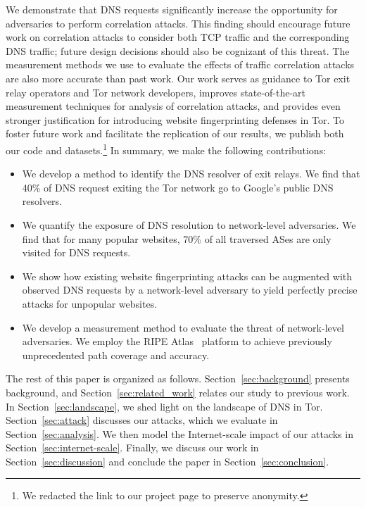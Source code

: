 We demonstrate that DNS requests significantly increase the opportunity
for adversaries to perform correlation attacks. This finding should
encourage future work on correlation attacks to consider both TCP
traffic and the corresponding DNS traffic; future design decisions
should also be cognizant of this threat.  The measurement methods we use
to evaluate the effects of traffic correlation attacks are also more
accurate than past work. Our work \first serves as guidance to Tor exit
relay operators and Tor network developers, \second improves
state-of-the-art measurement techniques for analysis of correlation attacks, and \third
provides even stronger justification for introducing website fingerprinting defenses in
Tor.  To foster future work and facilitate the replication of
our results, we publish both our code and datasets.\footnote{We redacted
  the link to our project page to preserve anonymity.} In
summary, we make the following contributions:
\begin{itemize}
\item We develop a method to identify the DNS resolver of exit
  relays. We find that 40\% of DNS request exiting the Tor network go to
  Google's public DNS resolvers.

	\item We quantify the exposure of DNS resolution to
		network-level adversaries.  We find that for many popular
		websites, 70\% of all traversed ASes are only visited for DNS requests.

	\item We show how existing website fingerprinting attacks can be augmented with
	observed DNS requests by a network-level adversary to yield perfectly precise
	\name attacks for unpopular websites.

	\item We develop a measurement method to evaluate the threat of
		network-level adversaries. We employ the RIPE Atlas~\cite{atlas}
		platform to achieve previously unprecedented path coverage and accuracy.
\end{itemize}
\noindent
The rest of this paper is organized as follows.
Section~\ref{sec:background} presents background, and
Section~\ref{sec:related_work} relates our study to previous work.  In
Section~\ref{sec:landscape}, we shed light on the landscape of DNS in
Tor.  Section~\ref{sec:attack} discusses our \name attacks, which we
evaluate in Section~\ref{sec:analysis}.  We then model the
Internet-scale impact of our attacks in
Section~\ref{sec:internet-scale}.  Finally, we discuss our work in
Section~\ref{sec:discussion} and conclude the paper in
Section~\ref{sec:conclusion}.

